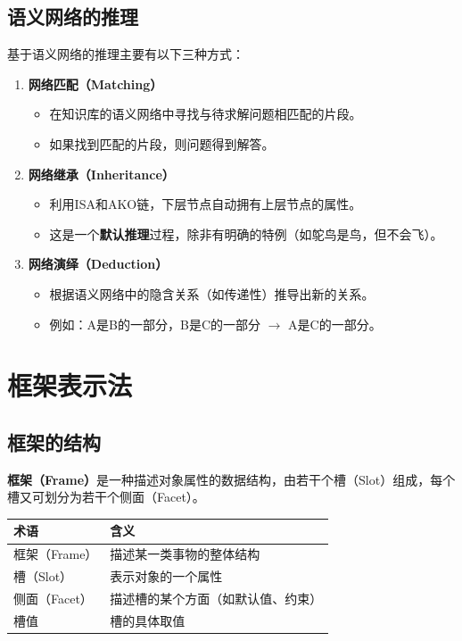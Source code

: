 \subsection{语义网络的推理}

基于语义网络的推理主要有以下三种方式：

\begin{enumerate}[leftmargin=2em,itemsep=0pt]
    \item \textbf{网络匹配（Matching）}
    \begin{itemize}
        \item 在知识库的语义网络中寻找与待求解问题相匹配的片段。
        \item 如果找到匹配的片段，则问题得到解答。
    \end{itemize}
    
    \item \textbf{网络继承（Inheritance）}
    \begin{itemize}
        \item 利用ISA和AKO链，下层节点自动拥有上层节点的属性。
        \item 这是一个\textbf{默认推理}过程，除非有明确的特例（如鸵鸟是鸟，但不会飞）。
    \end{itemize}
    
    \item \textbf{网络演绎（Deduction）}
    \begin{itemize}
        \item 根据语义网络中的隐含关系（如传递性）推导出新的关系。
        \item 例如：A是B的一部分，B是C的一部分 $\to$ A是C的一部分。
    \end{itemize}
\end{enumerate}

\section{框架表示法}

\subsection{框架的结构}
\begin{conceptbox}
\textbf{框架（Frame）}是一种描述对象属性的数据结构，由若干个槽（Slot）组成，每个槽又可划分为若干个侧面（Facet）。
\end{conceptbox}

\begin{table}[htbp]
\centering\small
\begin{tabular}{ll}
\toprule
\textbf{术语} & \textbf{含义} \\
\midrule
框架（Frame） & 描述某一类事物的整体结构 \\
槽（Slot） & 表示对象的一个属性 \\
侧面（Facet） & 描述槽的某个方面（如默认值、约束） \\
槽值 & 槽的具体取值 \\
\bottomrule
\end{tabular}
\end{table}

